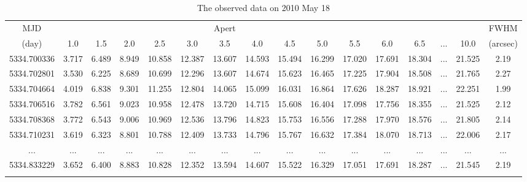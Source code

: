 \documentclass[structabstract]{raa}
\begin{document}
\begin{table}
\begin{center}
\begin{minipage}[]{100mm}
\caption[]{The observed data on 2010 May 18}
\label{Table5}
 \end{minipage}
 \setlength{\tabcolsep}{2.5pt}
\small
\begin{tabular}{cccccccccccccccc}
\hline\noalign{\smallskip}
  MJD  &   &   &   &  & &  Apert &  &    &   &  & &   &   &   &  FWHM  \\ \cline{2-15}

  (day)  &1.0  & 1.5  &2.0   & 2.5 &  3.0  & 3.5   & 4.0  & 4.5   &5.0   &5.5 & 6.0 & 6.5 & ...  & 10.0& (arcsec)  \\

\hline\noalign{\smallskip}
5334.700336  & 3.717  & 6.489  & 8.949  &10.858  &12.387  &13.607  &14.593  &15.494  &16.299  &17.020  &17.691  &18.304  & ...  &21.525  & 2.19  \\
5334.702801  & 3.530  & 6.225  & 8.689  &10.699  &12.296  &13.607  &14.674  &15.623  &16.465  &17.225  &17.904  &18.508  & ...  &21.765  & 2.27  \\
5334.704664  & 4.019  & 6.838  & 9.301  &11.255  &12.804  &14.065  &15.099  &16.031  &16.864  &17.626  &18.287  &18.921  & ...  &22.251  & 1.99  \\
5334.706516  & 3.782  & 6.561  & 9.023  &10.958  &12.478  &13.720  &14.715  &15.608  &16.404  &17.098  &17.756  &18.355  & ...  &21.525  & 2.12  \\
5334.708368  & 3.772  & 6.543  & 9.006  &10.969  &12.536  &13.796  &14.823  &15.753  &16.556  &17.288  &17.970  &18.576  & ...  &21.805  & 2.14  \\
5334.710231  & 3.619  & 6.323  & 8.801  &10.788  &12.409  &13.733  &14.796  &15.767  &16.632  &17.384  &18.070  &18.713  & ...  &22.006  & 2.17  \\
 ...          & ...    & ...    & ...    & ...    & ...    & ...    & ...    & ...    & ...    & ...    & ...    & ...    & ...    & ... & ...   \\
5334.833229  & 3.652  & 6.400  & 8.883  &10.828  &12.352  &13.594  &14.607  &15.522  &16.329  &17.051  &17.691  &18.287  & ...  &21.545  & 2.19 \\
\noalign{\smallskip}\hline
\end{tabular}
\end{center}
\end{table}
\end{document}
